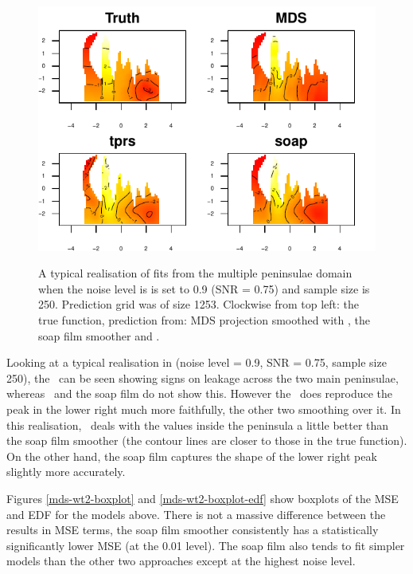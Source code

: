 \begin{figure}
\centering
\includegraphics[width=6in]{mds/figs/wt2-comp-09.pdf} \\
\caption{A typical realisation of fits from the multiple peninsulae domain when the noise level is  is set to 0.9 (SNR = 0.75) and sample size is 250. Prediction grid was of size 1253. Clockwise from top left: the true function, prediction from: MDS projection smoothed with \tprs, the soap film smoother and \tprs.}
\label{wt2-comp-0.9}
\end{figure}

Looking at a typical realisation in  (noise level = 0.9, SNR = 0.75, sample size 250), the \tprs\ can be seen showing signs on leakage across the two main peninsulae, whereas \mdsap\ and the soap film do not show this. However the \tprs\ does reproduce the peak in the lower right much more faithfully, the other two smoothing over it. In this realisation, \mdsap\ deals with the values inside the peninsula a little better than the soap film smoother (the contour lines are closer to those in the true function). On the other hand, the soap film captures the shape of the lower right peak slightly more accurately.

Figures \ref{mds-wt2-boxplot} and \ref{mds-wt2-boxplot-edf} show boxplots of the MSE and EDF for the models above. There is not a massive difference between the results in MSE terms, the soap film smoother consistently has a statistically significantly lower MSE (at the 0.01 level). The soap film also tends to fit simpler models than the other two approaches except at the highest noise level.

